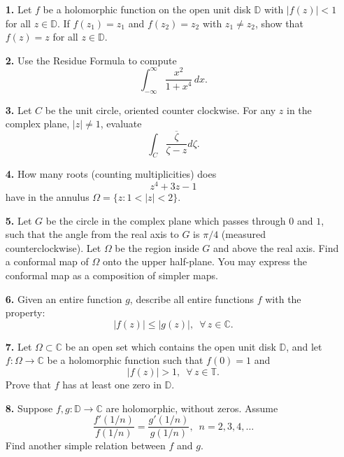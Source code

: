 \documentclass[12pt]{amsart}
\newcommand{\D}{\mathbb{D} }
\newcommand{\T}{\mathbb{T} }
\newcommand{\C}{\mathbb{C} }
\begin{document}
\begin{itemize}
\item[{\bf 1.}] Let $f$ be a holomorphic function on the open unit
disk $\D $ with $|f (z)|<1$ for all $z\in\D$. If $f (z_{1})=z_{1}$ and
$f (z_{2})=z_{2}$ with $z_{1}\neq z_{2}$, show that $f (z)=z$ for all $z\in\D$.


\item[{\bf 2.}] Use the Residue Formula to compute
\[
\int_{-\infty}^\infty\frac{x^2}{1+x^4}\,dx.
\]








\item[{\bf 3.}] Let $C$ be the unit circle, oriented counter
clockwise. For any $z$ in the complex plane, $|z|\neq 1$, evaluate
\[
\int_{C}\frac{\overline {\zeta }}{\zeta -z}d\zeta .
\]

\item[{\bf 4.}] How many roots (counting multiplicities) does
\[
z^{4}+3z-1
\]
have in the annulus $\Omega =\{z: 1<|z|<2 \}$.


\item[{\bf 5.}] Let $G$ be the circle in the complex plane which
passes through $0$ and $1$, such that the angle from the real axis to
$G$ is $\pi/4$ (measured counterclockwise). Let $\Omega $ be the
region inside $G$ and above the real axis. Find a conformal map of
$\Omega $ onto the upper half-plane. You may express the conformal map
as a composition of simpler maps.


\item[{\bf 6.}] Given an entire function $g$, describe all entire functions $f$
with the property:
$$
|f(z)|\leq |g(z)|,\,\,\,\forall\,z\in\C.$$



\item[{\bf 7.}] Let $\Omega\subset\C$ be an open set which contains the open
unit disk $\D$, and let $f:\Omega\to\C$ be a holomorphic function such that
$f(0)=1$ and
$$
|f(z)|>1,\,\,\,\forall\,z\in\T.$$
Prove that $f$ has at least one zero in $\D$.




\item[{\bf 8.}] Suppose $f,g:\D\to\C$ are holomorphic, without zeros. Assume
$$
\frac{f'(1/n)}{f(1/n)}=\frac{g'(1/n)}{g(1/n)},\,\,\,n=2,3,4,\dots$$
Find another simple relation between $f$ and $g$.


\end{itemize}
\end{document}
